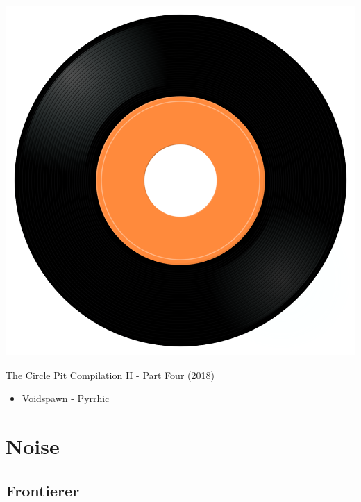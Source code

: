 \begin{minipage}[t]{0.25\textwidth}\vspace{0pt}
\captionsetup{type=figure}
\includegraphics[width=\textwidth]{Images/cover.png}
\caption*{The Circle Pit Compilation II - Part Four (2018)}
\end{minipage}
\begin{minipage}[t]{0.25\textwidth}\vspace{0pt}
\begin{itemize}[nosep,leftmargin=1em,labelwidth=*,align=left]
	\setlength{\itemsep}{0pt}
	\item Voidspawn - Pyrrhic
\end{itemize}
\end{minipage}


\section{Noise}

\subsection{Frontierer}

